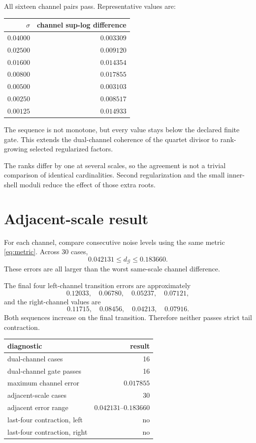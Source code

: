 \documentclass[11pt]{article}
\theoremstyle{remark}\newtheorem{remark}[theorem]{Remark}
\begin{document}
All sixteen channel pairs pass. Representative values are:
\begin{center}
\begin{tabular}{rr}
\toprule
$\sigma$ & channel sup-log difference\\
\midrule
$0.04000$ & $0.003309$\\
$0.02500$ & $0.009120$\\
$0.01600$ & $0.014354$\\
$0.00800$ & $0.017855$\\
$0.00500$ & $0.003103$\\
$0.00250$ & $0.008517$\\
$0.00125$ & $0.014933$\\
\bottomrule
\end{tabular}
\end{center}
The sequence is not monotone, but every value stays below the declared finite
gate. This extends the dual-channel coherence of the quartet divisor to
rank-growing selected regularized factors.

The ranks differ by one at several scales, so the agreement is not a trivial
comparison of identical cardinalities. Second regularization and the small
inner-shell moduli reduce the effect of those extra roots.

\section{Adjacent-scale result}

For each channel, compare consecutive noise levels using the same metric
\eqref{eq:metric}. Across 30 cases,
\[
 0.042131\le d_{\mathcal G}\le0.183660.
\]
These errors are all larger than the worst same-scale channel difference.

The final four left-channel transition errors are approximately
\[
 0.12033,\quad0.06780,\quad0.05237,\quad0.07121,
\]
and the right-channel values are
\[
 0.11715,\quad0.08456,\quad0.04213,\quad0.07916.
\]
Both sequences increase on the final transition. Therefore neither passes
strict tail contraction.

\begin{center}
\begin{tabular}{lr}
\toprule
diagnostic & result\\
\midrule
dual-channel cases & 16\\
dual-channel gate passes & 16\\
maximum channel error & $0.017855$\\
adjacent-scale cases & 30\\
adjacent error range & $0.042131$--$0.183660$\\
last-four contraction, left & no\\
last-four contraction, right & no\\
\bottomrule
\end{tabular}
\end{center}
\end{document}
